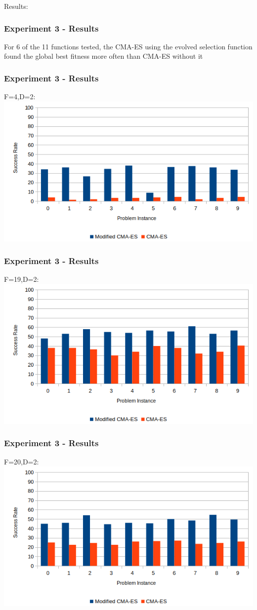 \documentclass{beamer}
\begin{document}
	\begin{frame}
	Results:
		\frametitle{Experiment 3 - Results}
		For 6 of the 11 functions tested, the CMA-ES using the evolved selection function found the global best fitness more often than CMA-ES without it
		
	\end{frame} 
		
	\begin{frame}
		\frametitle{Experiment 3 - Results}
		\centering
		F=4,D=2:
		\includegraphics[width=\textwidth]{experiment3_f4d2_bargraph}
	\end{frame} 		
	
	\begin{frame}
		\frametitle{Experiment 3 - Results}
		\centering
		F=19,D=2:
		\includegraphics[width=\textwidth]{experiment3_f19d2_bargraph}
	\end{frame} 	
	
	\begin{frame}
		\frametitle{Experiment 3 - Results}
		\centering
		F=20,D=2:
		\includegraphics[width=\textwidth]{experiment3_f20d2_bargraph}
	\end{frame} 
	
\end{document}

